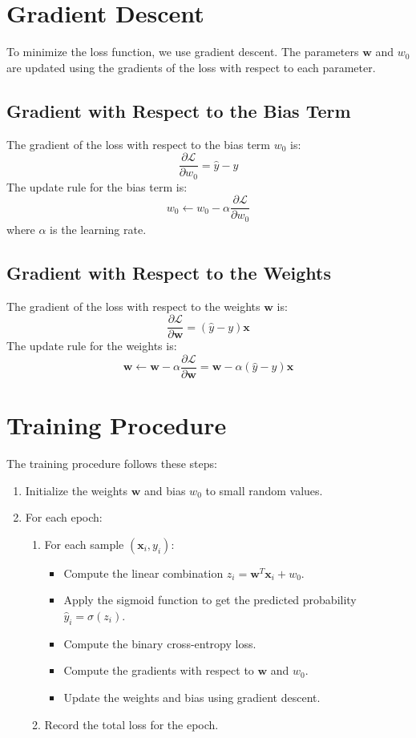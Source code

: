 \documentclass{article}
\begin{document}
\section{Gradient Descent}

To minimize the loss function, we use gradient descent. The parameters $\mathbf{w}$ and $w_0$ are updated using the gradients of the loss with respect to each parameter.

\subsection{Gradient with Respect to the Bias Term}
The gradient of the loss with respect to the bias term $w_0$ is:
\[
\frac{\partial \mathcal{L}}{\partial w_0} = \hat{y} - y
\]
The update rule for the bias term is:
\[
w_0 \leftarrow w_0 - \alpha \frac{\partial \mathcal{L}}{\partial w_0}
\]
where $\alpha$ is the learning rate.

\subsection{Gradient with Respect to the Weights}
The gradient of the loss with respect to the weights $\mathbf{w}$ is:
\[
\frac{\partial \mathcal{L}}{\partial \mathbf{w}} = (\hat{y} - y) \mathbf{x}
\]
The update rule for the weights is:
\[
\mathbf{w} \leftarrow \mathbf{w} - \alpha \frac{\partial \mathcal{L}}{\partial \mathbf{w}} = \mathbf{w} - \alpha (\hat{y} - y) \mathbf{x}
\]

\section{Training Procedure}

The training procedure follows these steps:
\begin{enumerate}
    \item Initialize the weights $\mathbf{w}$ and bias $w_0$ to small random values.
    \item For each epoch:
    \begin{enumerate}
        \item For each sample $(\mathbf{x}_i, y_i)$:
        \begin{itemize}
            \item Compute the linear combination $z_i = \mathbf{w}^T \mathbf{x}_i + w_0$.
            \item Apply the sigmoid function to get the predicted probability $\hat{y}_i = \sigma(z_i)$.
            \item Compute the binary cross-entropy loss.
            \item Compute the gradients with respect to $\mathbf{w}$ and $w_0$.
            \item Update the weights and bias using gradient descent.
        \end{itemize}
        \item Record the total loss for the epoch.
    \end{enumerate}
\end{enumerate}
\end{document}
